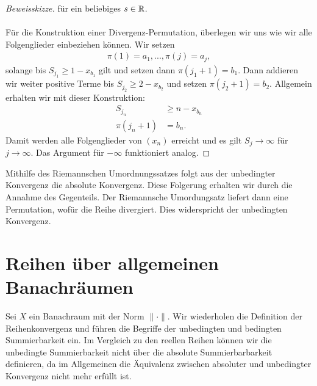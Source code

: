 \begin{proof}[Beweisskizze]
	für ein beliebiges $ s \in \mathbb{R} $.\\
	\\
	Für die Konstruktion einer Divergenz-Permutation, überlegen wir uns wie wir alle Folgenglieder einbeziehen können.
	\newpage
	Wir setzen 
	\begin{align*}
	\pi(1) = a_1,...,\pi(j) =a_j,
	\end{align*}
	solange bis $ S_{j_1} \geq 1-x_{b_1}  $ gilt und setzen dann $ \pi(j_1 + 1) = b_1 $.
	Dann addieren wir weiter positive Terme bis $ S_{j_2} \geq 2 - x_{b_2} $ und setzen $ \pi(j_2 + 1) = b_2 $.
	Allgemein erhalten wir mit dieser Konstruktion:
	\begin{align*}
	S_{j_n} &\geq n - x_{b_n}\\
	\pi(j_n + 1) &= b_n.
	\end{align*}
	Damit werden alle Folgenglieder von $ (x_n) $ erreicht und es gilt $ S_j \to \infty $ für $ j \to \infty $.
	Das Argument für $ - \infty $ funktioniert analog.  

\end{proof}

Mithilfe des Riemannschen Umordnungssatzes folgt aus der unbedingter Konvergenz die absolute Konvergenz.
Diese Folgerung erhalten wir durch die Annahme des Gegenteils.
Der Riemannsche Umordungsatz liefert dann eine Permutation, wofür die Reihe divergiert.
Dies widerspricht der unbedingten Konvergenz.


\section{Reihen über allgemeinen Banachräumen}
Sei $ X $ ein Banachraum mit der Norm $ \| \cdot \| $.
Wir wiederholen die Definition der Reihenkonvergenz und führen  die Begriffe der unbedingten und bedingten Summierbarkeit ein.
Im Vergleich zu den reellen Reihen können wir die unbedingte Summierbarkeit nicht über die absolute Summierbarbarkeit definieren, da im Allgemeinen die Äquivalenz zwischen absoluter und unbedingter Konvergenz nicht mehr erfüllt ist.



